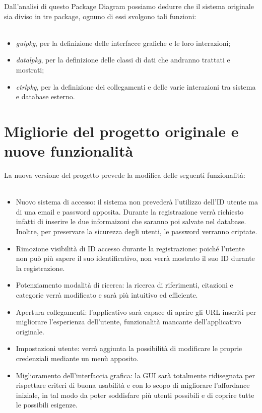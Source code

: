 Dall'analisi di questo Package Diagram possiamo dedurre che il sistema originale sia diviso in tre package, ognuno di essi svolgono tali funzioni: \\~\\
\begin{itemize}
    \item \textit{guipkg}, per la definizione delle interfacce grafiche e le loro interazioni; \\ 
    \item \textit{datalpkg}, per la definizione delle classi di dati che andranno trattati e mostrati;\\
    \item \textit{ctrlpkg}, per la definizione dei collegamenti e delle varie interazioni tra sistema e database esterno.
\end{itemize}
\newpage
\raggedright{\section{Migliorie del progetto originale e nuove funzionalità}}
La nuova versione del progetto prevede la modifica delle seguenti funzionalità: \\~\\
\begin{itemize}
    \item \label{nuovo:accesso} Nuovo sistema di accesso: il sistema non prevederà l'utilizzo dell'ID utente ma di una email e password apposita. Durante la registrazione verrà richiesto infatti di inserire le due informaizoni che saranno poi salvate nel database. Inoltre, per preservare la sicurezza degli utenti, le password verranno criptate.
    \item Rimozione visibilità di ID accesso durante la registrazione: poiché l'utente non può più sapere il suo identificativo, non verrà mostrato il suo ID durante la registrazione.
    \item Potenziamento modalità di ricerca: la ricerca di riferimenti, citazioni e categorie verrà modificato e sarà più intuitivo ed efficiente.
    \item Apertura collegamenti: l'applicativo sarà capace di aprire gli URL inseriti per migliorare l'esperienza dell'utente, funzionalità mancante dell'applicativo originale.
    \item Impostazioni utente: verrà aggiunta la possibilità di modificare le proprie credenziali mediante un menù apposito.
    \item Miglioramento dell'interfaccia grafica: la GUI sarà totalmente ridisegnata per rispettare criteri di buona usabilità e con lo scopo di migliorare l'affordance iniziale, in tal modo da poter soddisfare più utenti possibili e di coprire tutte le possibili esigenze.
\end{itemize}
